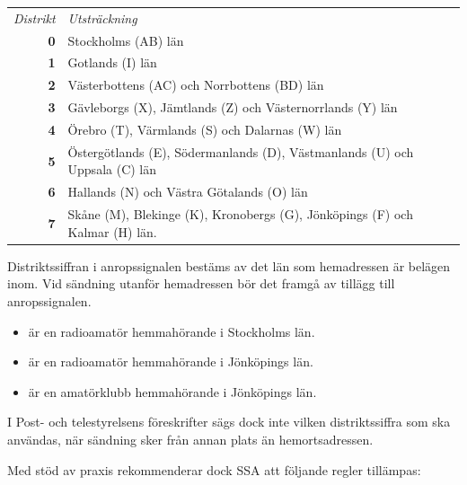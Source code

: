 \begin{center}
\begin{tabular}{rp{6cm}}
\emph{Distrikt} & \emph{Utsträckning} \\
\textbf{0} & Stockholms (AB) län \\
\textbf{1} & Gotlands (I) län \\
\textbf{2} & Västerbottens (AC) och Norrbottens (BD) län \\
\textbf{3} & Gävleborgs (X), Jämtlands (Z) och Västernorrlands (Y) län \\
\textbf{4} & Örebro (T), Värmlands (S) och Dalarnas (W) län \\
\textbf{5} & Östergötlands (E), Södermanlands (D), Västmanlands (U) och Uppsala (C) län\\
\textbf{6} & Hallands (N) och Västra Götalands (O) län \\
\textbf{7} & Skåne (M), Blekinge (K), Kronobergs (G), Jönköpings (F) och Kalmar (H) län.\\
\end{tabular}
\end{center}

Distriktssiffran i anropssignalen bestäms av det län som hemadressen är belägen inom.
Vid sändning utanför hemadressen bör det framgå av tillägg till anropssignalen.

\begin{exempelbox}
	\begin{itemize}
		\item {} är en radioamatör hemmahörande i Stockholms län.
		\item {} är en radioamatör hemmahörande i Jönköpings län.
		\item {} är en amatörklubb hemmahörande i Jönköpings län.
	\end{itemize}
\end{exempelbox}
\medskip

I Post- och telestyrelsens föreskrifter sägs dock inte vilken distriktssiffra
som ska användas, när sändning sker från annan plats än hemortsadressen.

Med stöd av praxis rekommenderar dock SSA att följande regler tillämpas:

